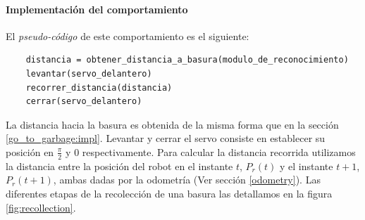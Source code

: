 \paragraph{Implementaci\'on del comportamiento}
El \emph{pseudo-c\'odigo} de este comportamiento es el siguiente:

\begin{verbatim}
    distancia = obtener_distancia_a_basura(modulo_de_reconocimiento)
    levantar(servo_delantero)
    recorrer_distancia(distancia)
    cerrar(servo_delantero)
\end{verbatim}

La distancia hacia la basura es obtenida de la misma forma que en la secci\'on
\ref{go_to_garbage:impl}. Levantar y cerrar el servo consiste en establecer su
posici\'on en $\frac{\pi}{2}$ y $0$ respectivamente. Para calcular la distancia
recorrida utilizamos la distancia entre la posici\'on del robot en el
instante $t$, $P_r(t)$ y el instante $t+1$, $P_r(t+1)$, ambas dadas por la
odometr\'ia (Ver secci\'on \ref{odometry}). Las diferentes etapas de la
recolecci\'on de una basura las detallamos en la figura \ref{fig:recollection}.

